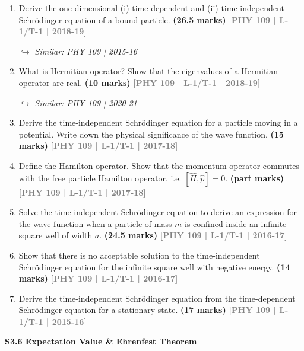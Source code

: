 \documentclass[12pt,a3paper]{article}
\newcommand{\yr}[1]{\hfill\textcolor{gray}{\small\textbf{[#1]}}}
\newcommand{\mk}[1]{\textcolor{orange!70!black}{\small\textbf{(#1 marks)}}}
\newcommand{\variant}[1]{\par\vspace{1pt}\textcolor{blue!50!black}%
  {\footnotesize\textit{$\hookrightarrow$ Similar: #1}}}
\newcommand{\subtopic}[2]{%
  \vspace{10pt}
  \noindent\begin{tcolorbox}[colback=#1!8,colframe=#1,boxrule=0.6pt,arc=4pt,
    left=6pt,right=6pt,top=4pt,bottom=4pt]
    \small\bfseries\textcolor{#1}{#2}
  \end{tcolorbox}
  \vspace{2pt}
}
\begin{document}
\begin{enumerate}
\item Derive the one-dimensional (i) time-dependent and (ii) time-independent Schr\"odinger equation of a bound particle.
\mk{26.5} \yr{PHY 109 | L-1/T-1 | 2018-19}
\variant{PHY 109 | 2015-16}

\item What is Hermitian operator? Show that the eigenvalues of a Hermitian operator are real.
\mk{10} \yr{PHY 109 | L-1/T-1 | 2018-19}
\variant{PHY 109 | 2020-21}

\item Derive the time-independent Schr\"odinger equation for a particle moving in a potential. Write down the physical significance of the wave function.
\mk{15} \yr{PHY 109 | L-1/T-1 | 2017-18}

\item Define the Hamilton operator. Show that the momentum operator commutes with the free particle Hamilton operator, i.e. $[\hat{H}, \hat{p}] = 0$.
\mk{part} \yr{PHY 109 | L-1/T-1 | 2017-18}

\item Solve the time-independent Schr\"odinger equation to derive an expression for the wave function when a particle of mass $m$ is confined inside an infinite square well of width $a$.
\mk{24.5} \yr{PHY 109 | L-1/T-1 | 2016-17}

\item Show that there is no acceptable solution to the time-independent Schr\"odinger equation for the infinite square well with negative energy.
\mk{14} \yr{PHY 109 | L-1/T-1 | 2016-17}

\item Derive the time-independent Schr\"odinger equation from the time-dependent Schr\"odinger equation for a stationary state.
\mk{17} \yr{PHY 109 | L-1/T-1 | 2015-16}

\end{enumerate}

\label{sec:s36}
\subtopic{cA}{S3.6 \quad Expectation Value \& Ehrenfest Theorem}
\end{document}
